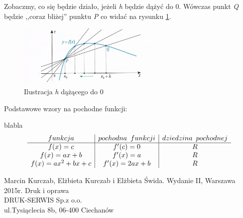 \documentclass[12pt]{article}
\begin{document}
Zobaczmy, co się będzie działo, jeżeli \textit{h} będzie dążyć do 0. Wówczas punkt \textit{Q} będzie ,,coraz bliżej'' punktu \textit{P} co widać na rysunku \ref{rys2_model}. 
\begin{figure}[ht]
\begin{center}
\includegraphics[height=3cm]{zdj2.jpg}
\caption{Ilustracja \textit{h} dążącego do 0}
\label{rys2_model}
\end{center}
\end{figure}
\begin{center}
Podstawowe wzory na pochodne funkcji:
\end{center}
blabla
\[
\begin{array}{c|c|c}
funkcja & pochodna \hspace{5px} funkcji & dziedzina  \hspace{5px} pochodnej\\
\hline
f(x)=c & f'(c)= 0 & R \\
f(x) = ax + b & f'(x) = a & R\\
f(x) = ax^2 + bx + c & f'(x) = 2ax + b & R
\end{array}
\]
\newpage
\begin{thebibliography}{9}
Marcin Kurczab, Elżbieta Kurczab i Elżbieta Świda. Wydanie II, Warszawa 2015r.
Druk i oprawa\\
DRUK-SERWIS Sp.z o.o.\\
ul.Tysiąclecia 8b, 06-400 Ciechanów
\end{thebibliography}
\end{document}
